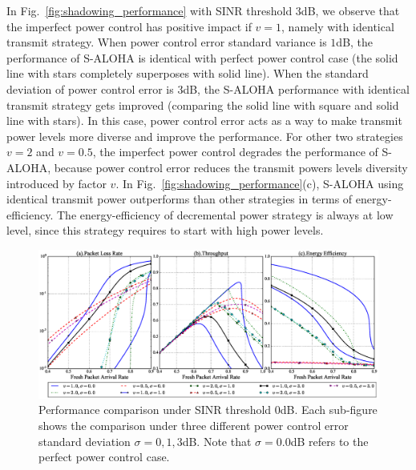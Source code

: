 In Fig.~\ref{fig:shadowing_performance} with SINR threshold $3$dB, we observe that the imperfect power control has positive impact if $v=1$, namely with identical transmit strategy. When power control error standard variance is $1$dB, the performance of S-ALOHA is identical with perfect power control case (the solid line with stars completely superposes with solid line). When the standard deviation of power control error is $3$dB, the S-ALOHA performance with identical transmit strategy gets improved (comparing the solid line with square and solid line with stars). In this case, power control error acts as a way to make transmit power levels more diverse and improve the performance. For other two strategies $v=2$ and $v=0.5$, the imperfect power control degrades the performance of S-ALOHA, because power control error reduces the transmit powers levels diversity introduced by factor $v$. In Fig.~\ref{fig:shadowing_performance}(c), S-ALOHA using identical transmit power outperforms than other strategies in terms of energy-efficiency. The energy-efficiency of decremental power strategy is always at low level, since this strategy requires to start with high power levels. 

\begin{figure}[!th]
	\centering
	\includegraphics[width=1.0\linewidth]{Chapter4/Figures/shadowing_performance_case_0.0.eps}
	\caption{Performance comparison under SINR threshold $0$dB. Each sub-figure shows the comparison under three different power control error standard deviation $\sigma = 0, 1, 3$dB. Note that $\sigma=0.0$dB refers to the perfect power control case.}
	\label{fig:shadowing_performance_0}
\end{figure}

